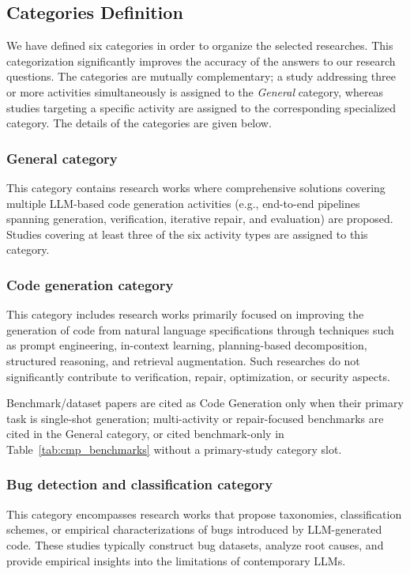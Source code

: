 \documentclass[10pt,a4paper]{article}
\begin{document}
\subsection{Categories Definition}
\label{sec:categories}
We have defined six categories in order to organize the selected researches. This categorization significantly improves the accuracy of the answers to our research questions. The categories are mutually complementary; a study addressing three or more activities simultaneously is assigned to the \textit{General} category, whereas studies targeting a specific activity are assigned to the corresponding specialized category. The details of the categories are given below.

\subsubsection{General category}
\label{sec:cat_general}
This category contains research works where comprehensive solutions covering multiple LLM-based code generation activities (e.g., end-to-end pipelines spanning generation, verification, iterative repair, and evaluation) are proposed. Studies covering at least three of the six activity types are assigned to this category.

\subsubsection{Code generation category}
\label{sec:cat_generation}
This category includes research works primarily focused on improving the generation of code from natural language specifications through techniques such as prompt engineering, in-context learning, planning-based decomposition, structured reasoning, and retrieval augmentation. Such researches do not significantly contribute to verification, repair, optimization, or security aspects.

Benchmark/dataset papers are cited as Code Generation only when their primary task is single-shot generation; multi-activity or repair-focused benchmarks are cited in the General category, or cited benchmark-only in Table~\ref{tab:cmp_benchmarks} without a primary-study category slot.

\subsubsection{Bug detection and classification category}
\label{sec:cat_bugs}
This category encompasses research works that propose taxonomies, classification schemes, or empirical characterizations of bugs introduced by LLM-generated code. These studies typically construct bug datasets, analyze root causes, and provide empirical insights into the limitations of contemporary LLMs.
\end{document}
